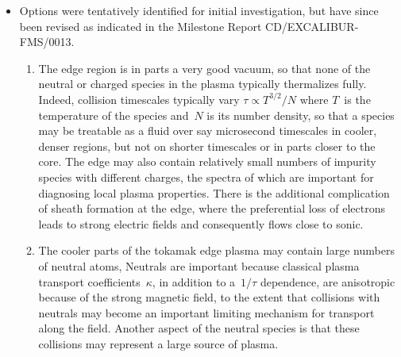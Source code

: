 \begin{itemize}
\item Options were tentatively identified for initial investigation,
but have since been revised as indicated in the Milestone Report
CD/EXCALIBUR-FMS/0013.
\begin{enumerate}
\item The edge region is in parts a very good vacuum, so
that none of the neutral or charged species in the plasma typically thermalizes fully.
Indeed, collision timescales typically vary $\tau\propto T^{3/2}/N$ where $T$~is the temperature of the species
and~$N$ is its number density, so that a species may be treatable as a fluid over say microsecond
timescales in cooler, denser regions, but not on shorter timescales or in parts closer to the core.
The edge may also contain relatively small numbers of impurity species with different charges,
the spectra of which are important for diagnosing local plasma properties.
There is the additional complication of sheath formation at the edge, where the preferential
loss of electrons leads to strong electric fields and consequently flows close to sonic.

\item The cooler parts of the tokamak edge plasma may contain large numbers of neutral atoms,
Neutrals are important because classical plasma transport coefficients~$\kappa$, in
addition to a~$1/\tau$ dependence, are anisotropic because of the strong magnetic field,
to the extent that collisions with neutrals may become an important limiting mechanism
for transport along the field. Another aspect of the neutral species is that
these collisions may represent a large source of plasma.

\end{enumerate}


\end{itemize}
